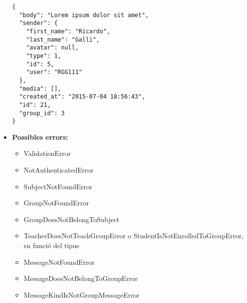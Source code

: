 \begin{itemize}
\begin{verbatim}
{
  "body": "Lorem ipsum dolor sit amet",
  "sender": {
    "first_name": "Ricardo",
    "last_name": "Galli",
    "avatar": null,
    "type": 1,
    "id": 5,
    "user": "RGG111"
  },
  "media": [],
  "created_at": "2015-07-04 18:56:43",
  "id": 21,
  "group_id": 3
}
	\end{verbatim}
	\item \textbf{Possibles errors:}
	\begin{itemize}
		\item ValidationError
		\item NotAuthenticatedError
		\item SubjectNotFoundError
		\item GroupNotFoundError
		\item GroupDoesNotBelongToSubject
		\item TeacherDoesNotTeachGroupError o StudentIsNotEnrolledToGroupError, en funció del tipus
		\item MessageNotFoundError
		\item MessageDoesNotBelongToGroupError
		\item MessageKindIsNotGroupMessageError
	\end{itemize}
	
	
	\end{itemize}
	
